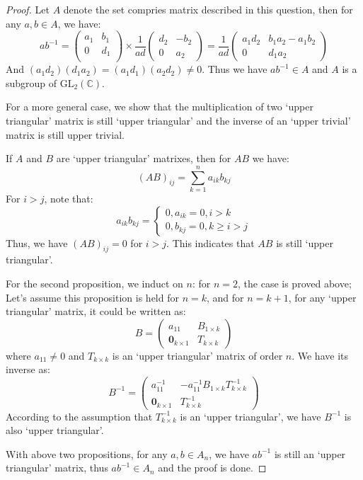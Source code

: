 \documentclass[a4paper, pdf, 12pt]{article}
\begin{document}
\begin{proof}
  Let $A$ denote the set compries matrix described in this question, then for any $a,b\in A$, we have:
  $$
    ab^{-1} = \begin{pmatrix}
      a_{1} & b_{1} \\
      0     & d_{1} \\
    \end{pmatrix}
    \times
    \frac{1}{ad}
    \begin{pmatrix}
      d_{2} & -b_{2} \\
      0     & a_{2}
    \end{pmatrix}
    =\frac{1}{ad} \begin{pmatrix}
      a_1d_2 & b_1a_2 - a_1b_2 \\
      0      & d_1a_2
    \end{pmatrix}
  $$
  And $(a_1d_2)(d_1a_2) = (a_1d_1)(a_2d_2)\neq 0$. Thus we have $ab^{-1}\in A$ and $A$ is
  a subgroup of $\mbox{GL}_{2}(\mathbb{C})$.

  For a more general case, we show that the multiplication of two `upper triangular' matrix is still
  `upper triangular' and the inverse of an `upper trivial' matrix is still upper trivial.

  If $A$ and $B$ are `upper triangular' matrixes, then for $AB$ we have:
  $$
    (AB)_{ij} = \sum_{k = 1}^{n}a_{ik}b_{kj}
  $$
  For $i > j$, note that:
  $$
    a_{ik}b_{kj} =
    \begin{cases}
      0, a_{ik} = 0, i > k \\
      0, b_{kj} = 0, k \geq i > j
    \end{cases}
  $$
  Thus, we have $(AB)_{ij} = 0$ for $i > j$. This indicates that $AB$ is still `upper triangular'.

  For the second proposition, we induct on $n$: for $n=2$, the case is proved above; Let's assume this proposition is held
  for $n=k$, and for $n=k+1$, for any `upper triangular' matrix, it could be written as:
  $$
    B =
    \begin{pmatrix}
      a_{11}                 & B_{1\times k} \\
      \mathbf{0}_{k\times 1} & T_{k\times k}
    \end{pmatrix}
  $$ where $a_{11}\neq 0$ and $T_{k\times k}$ is an `upper triangular' matrix of order $n$.
  We have its inverse as:
  $$
    B^{-1} =
    \begin{pmatrix}
      a_{11}^{-1}            & -a_{11}^{-1}B_{1\times k}T_{k\times k}^{-1} \\
      \mathbf{0}_{k\times 1} & T_{k\times k}^{-1}
    \end{pmatrix}
  $$
  According to the assumption that $T_{k\times k}^{-1}$ is an `upper triangular', we have $B^{-1}$ is also `upper triangular'.

  With above two propositions, for any $a,b\in A_{n}$, we have $ab^{-1}$ is still an `upper triangular' matrix, thus $ab^{-1}\in A_{n}$ and the
  proof is done.
\end{proof}
\end{document}
